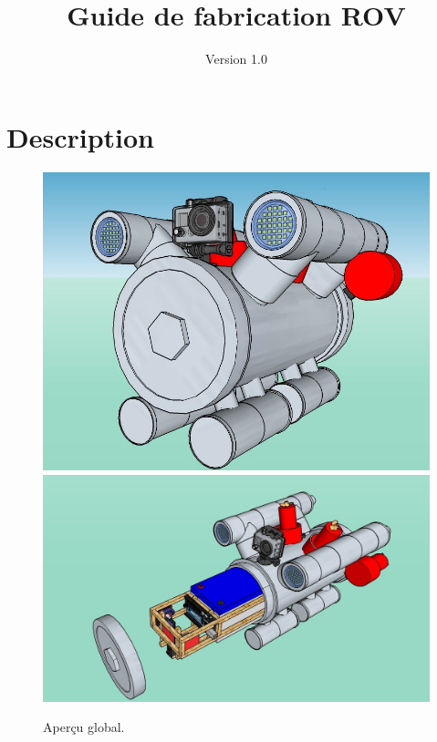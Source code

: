 \documentclass[11pt,a4paper]{article}
\title{Guide de fabrication ROV}
\date{Version 1.0}
\begin{document}
  \maketitle
  \tableofcontents
  
  \section{Description}
    \begin{figure}[H]
      \centering
      \includegraphics[scale=0.3]{ROVFinal.jpg}
      \includegraphics[scale=0.3]{ROVOuvert.jpg}
      \caption{Aperçu global.}
    \end{figure}
    
\end{document}
